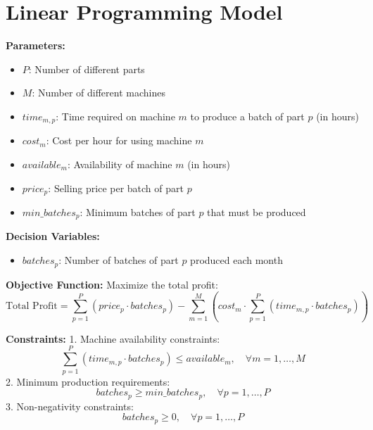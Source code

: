 \documentclass{article}
\begin{document}
\section*{Linear Programming Model}

\textbf{Parameters:}
\begin{itemize}
    \item $P$: Number of different parts
    \item $M$: Number of different machines
    \item $time_{m,p}$: Time required on machine $m$ to produce a batch of part $p$ (in hours)
    \item $cost_{m}$: Cost per hour for using machine $m$
    \item $available_{m}$: Availability of machine $m$ (in hours)
    \item $price_{p}$: Selling price per batch of part $p$
    \item $min\_batches_{p}$: Minimum batches of part $p$ that must be produced
\end{itemize}

\textbf{Decision Variables:}
\begin{itemize}
    \item $batches_{p}$: Number of batches of part $p$ produced each month
\end{itemize}

\textbf{Objective Function:}
Maximize the total profit:
\[
\text{Total Profit} = \sum_{p=1}^{P} (price_{p} \cdot batches_{p}) - \sum_{m=1}^{M} (cost_{m} \cdot \sum_{p=1}^{P} (time_{m,p} \cdot batches_{p}))
\]

\textbf{Constraints:}
1. Machine availability constraints:
\[
\sum_{p=1}^{P} (time_{m,p} \cdot batches_{p}) \leq available_{m}, \quad \forall m = 1, \ldots, M
\]
2. Minimum production requirements:
\[
batches_{p} \geq min\_batches_{p}, \quad \forall p = 1, \ldots, P
\]
3. Non-negativity constraints:
\[
batches_{p} \geq 0, \quad \forall p = 1, \ldots, P
\]
\end{document}
